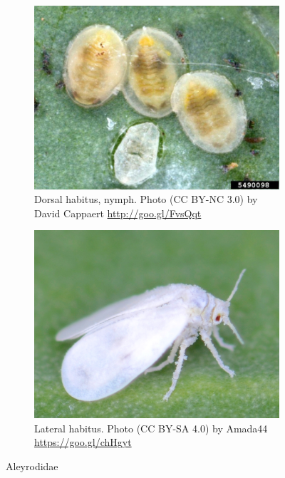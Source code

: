 \documentclass[letterpaper, 11pt]{article}
\begin{document}
\begin{figure}[ht!]
 \centering
 \begin{subfigure}[ht!]{0.45\textwidth}
  \includegraphics[width=\textwidth]{AleyrodidNymph}
  \caption{Dorsal habitus, nymph. Photo (CC BY-NC 3.0) by David Cappaert \url{http://goo.gl/FvsQqt}}
  \label{fig:aleyrodid1}
 \end{subfigure}
 \qquad
 \begin{subfigure}[ht!]{0.45\textwidth}
  \includegraphics[width=\textwidth]{AleyrodidHabitus}
  \caption{Lateral habitus. Photo (CC BY-SA 4.0) by Amada44 \url{https://goo.gl/chHgyt}}
  \label{fig:aleyrodid2}
 \end{subfigure}
 \caption{Aleyrodidae}\label{fig:aleyrodid}
\end{figure}
\end{document}
